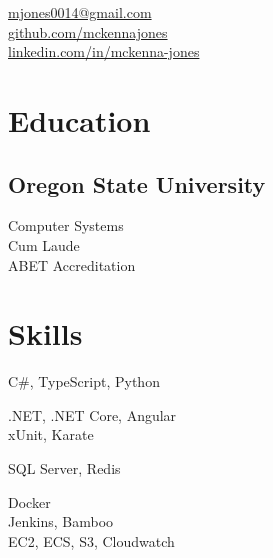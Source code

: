 \documentclass[]{hieudo-build}
\begin{document}
%
%
{
	\faEnvelope \href{mailto:mjones0014@gmail.com}{  mjones0014@gmail.com}\\
	\faGithub \href{https://github.com/mckennajones}{  github.com/mckennajones}\\
	\faLinkedinSquare \href{https://www.linkedin.com/in/mckenna-jones}{  linkedin.com/in/mckenna-jones}
}
    
%
%
\begin{minipage}[t]{0.25\textwidth} 

\section{Education} 

\subsection{Oregon State University}
Computer Systems \\
Cum Laude\\
ABET Accreditation \\

\vspace{20pt}
\section{Skills}
C\#, TypeScript, Python
\sectionsep

.NET, .NET Core, Angular\\
xUnit, Karate
\sectionsep


SQL Server, Redis \\
\sectionsep

Docker\\
Jenkins, Bamboo \\
EC2, ECS, S3, Cloudwatch




\end{minipage}
\end{document}
